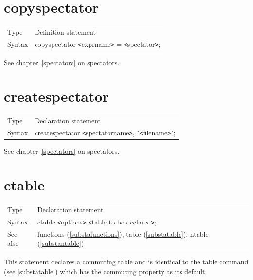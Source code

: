
\section{copyspectator}
\label{substacopyspectator}

\noindent \begin{tabular}{ll}
Type & Definition statement\\
Syntax & copyspectator {\tt<}exprname{\tt>} = {\tt<}spectator{\tt>};
\end{tabular} \vspace{4mm}

\noindent See chapter~\ref{spectators} on spectators.
\vspace{10mm}


\section{createspectator}
\label{substacreatespectator}

\noindent \begin{tabular}{ll}
Type & Declaration statement\\
Syntax & createspectator {\tt<}spectatorname{\tt>}, "{\tt<}filename{\tt>}";
\end{tabular} \vspace{4mm}

\noindent See chapter~\ref{spectators} on spectators.
\vspace{10mm}


\section{ctable}
\label{substactable}

\noindent \begin{tabular}{ll}
Type & Declaration statement\\
Syntax & ctable {\tt<}options{\tt>} {\tt<}table to be 
declared{\tt>}; \\
See also & functions (\ref{substafunctions}), table (\ref{substatable}),
        ntable (\ref{substantable})
\end{tabular} \vspace{4mm}

\noindent This statement declares a commuting 
table and is identical to the table command (see 
\ref{substatable}) which has the commuting property as its default. 
\vspace{10mm}

